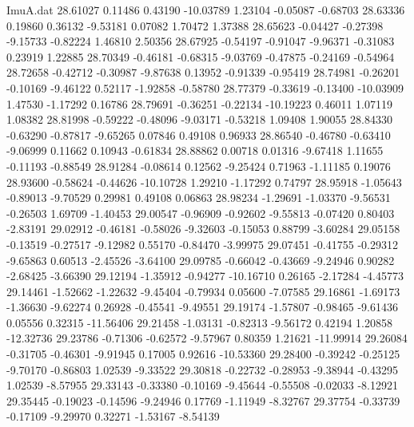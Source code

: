 \begin{filecontents}{ImuA.dat}
  28.61027    0.11486    0.43190  -10.03789    1.23104   -0.05087   -0.68703
  28.63336    0.19860    0.36132   -9.53181    0.07082    1.70472    1.37388
  28.65623   -0.04427   -0.27398   -9.15733   -0.82224    1.46810    2.50356
  28.67925   -0.54197   -0.91047   -9.96371   -0.31083    0.23919    1.22885
  28.70349   -0.46181   -0.68315   -9.03769   -0.47875   -0.24169   -0.54964
  28.72658   -0.42712   -0.30987   -9.87638    0.13952   -0.91339   -0.95419
  28.74981   -0.26201   -0.10169   -9.46122    0.52117   -1.92858   -0.58780
  28.77379   -0.33619   -0.13400  -10.03909    1.47530   -1.17292    0.16786
  28.79691   -0.36251   -0.22134  -10.19223    0.46011    1.07119    1.08382
  28.81998   -0.59222   -0.48096   -9.03171   -0.53218    1.09408    1.90055
  28.84330   -0.63290   -0.87817   -9.65265    0.07846    0.49108    0.96933
  28.86540   -0.46780   -0.63410   -9.06999    0.11662    0.10943   -0.61834
  28.88862    0.00718    0.01316   -9.67418    1.11655   -0.11193   -0.88549
  28.91284   -0.08614    0.12562   -9.25424    0.71963   -1.11185    0.19076
  28.93600   -0.58624   -0.44626  -10.10728    1.29210   -1.17292    0.74797
  28.95918   -1.05643   -0.89013   -9.70529    0.29981    0.49108    0.06863
  28.98234   -1.29691   -1.03370   -9.56531   -0.26503    1.69709   -1.40453
  29.00547   -0.96909   -0.92602   -9.55813   -0.07420    0.80403   -2.83191
  29.02912   -0.46181   -0.58026   -9.32603   -0.15053    0.88799   -3.60284
  29.05158   -0.13519   -0.27517   -9.12982    0.55170   -0.84470   -3.99975
  29.07451   -0.41755   -0.29312   -9.65863    0.60513   -2.45526   -3.64100
  29.09785   -0.66042   -0.43669   -9.24946    0.90282   -2.68425   -3.66390
  29.12194   -1.35912   -0.94277  -10.16710    0.26165   -2.17284   -4.45773
  29.14461   -1.52662   -1.22632   -9.45404   -0.79934    0.05600   -7.07585
  29.16861   -1.69173   -1.36630   -9.62274    0.26928   -0.45541   -9.49551
  29.19174   -1.57807   -0.98465   -9.61436    0.05556    0.32315  -11.56406
  29.21458   -1.03131   -0.82313   -9.56172    0.42194    1.20858  -12.32736
  29.23786   -0.71306   -0.62572   -9.57967    0.80359    1.21621  -11.99914
  29.26084   -0.31705   -0.46301   -9.91945    0.17005    0.92616  -10.53360
  29.28400   -0.39242   -0.25125   -9.70170   -0.86803    1.02539   -9.33522
  29.30818   -0.22732   -0.28953   -9.38944   -0.43295    1.02539   -8.57955
  29.33143   -0.33380   -0.10169   -9.45644   -0.55508   -0.02033   -8.12921
  29.35445   -0.19023   -0.14596   -9.24946    0.17769   -1.11949   -8.32767
  29.37754   -0.33739   -0.17109   -9.29970    0.32271   -1.53167   -8.54139

\end{filecontents}
